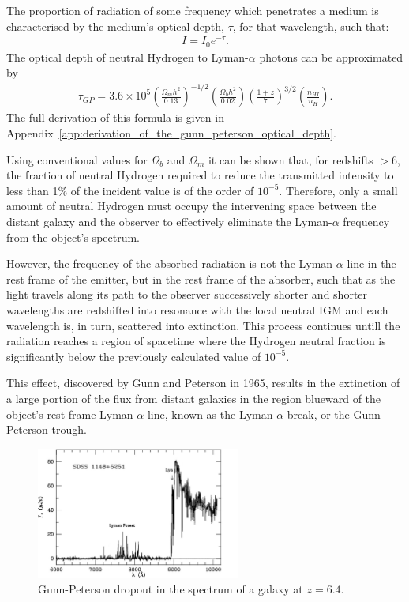 		The proportion of radiation of some frequency which penetrates a medium is characterised by the medium's optical depth, $\tau$, for that wavelength, such that:
		\begin{align}
			I = I_0 e^{-\tau}.
		\end{align}
		The optical depth of neutral Hydrogen to Lyman-$\alpha$ photons can be approximated by
		\begin{align}
			\tau_{GP} = 3.6 \times 10^5	\left ( 	\frac{\Omega_m h^2}{0.13}	\right ) ^{-1/2}
										\left ( 	\frac{\Omega_b h^2}{0.02}	\right )
										\left ( 	\frac{1+z}{7}			\right )^{3/2}
										\left ( 	\frac{n_{HI}}{n_H}			\right ) .
		\end{align}
		The full derivation of this formula is given in Appendix~\ref{app:derivation_of_the_gunn_peterson_optical_depth}.

		Using conventional values for $\Omega_b$ and $\Omega_m$ it can be shown that, for redshifts $>6$, the fraction of neutral Hydrogen required to reduce the transmitted intensity to less than 1\% of the incident value is of the order of $10^{-5}$. Therefore, only a small amount of neutral Hydrogen must occupy the intervening space between the distant galaxy and the observer to effectively eliminate the Lyman-$\alpha$ frequency from the object's spectrum.

		However, the frequency  of the absorbed radiation is not the Lyman-$\alpha$ line in the rest frame of the emitter, but in the rest frame of the absorber, such that as the light travels along its path to the observer successively shorter and shorter wavelengths are redshifted into resonance with the local neutral IGM and each wavelength is, in turn, scattered into extinction. This process continues untill the radiation reaches a region of spacetime where the Hydrogen neutral fraction is significantly below the previously calculated value of $10^{-5}$.

		This effect, discovered by Gunn and Peterson in 1965, results in the extinction of a large portion of the flux from distant galaxies in the region blueward of the object's rest frame  Lyman-$\alpha$ line, known as the Lyman-$\alpha$ break, or the Gunn-Peterson trough.
		\begin{figure}[htbp]
			\centering
			\includegraphics[width=0.6\textwidth]{../Images/dropout.jpg}
			\caption{Gunn-Peterson dropout in the spectrum of a galaxy at $z=6.4$.}\label{fig:dropout}
		\end{figure}

